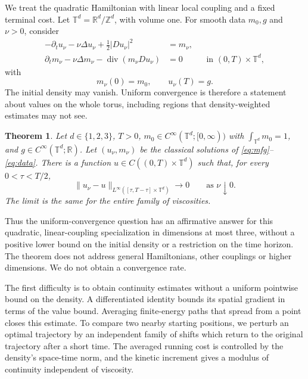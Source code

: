 \documentclass[11pt]{article}
\newcommand{\T}{\mathbb T}
\numberwithin{equation}{section}
\newtheorem{theorem}{Theorem}[section]
\begin{document}
We treat the quadratic Hamiltonian with linear local coupling and a
fixed terminal cost. Let \(\T^d=\mathbb R^d/\mathbb Z^d\), with volume
one. For smooth data \(m_0,g\) and \(\nu>0\), consider
\begin{equation}\label{eq:mfg}
\begin{aligned}
 -\partial_tu_\nu-\nu\Delta u_\nu+\tfrac12|Du_\nu|^2&=m_\nu,\\
 \partial_tm_\nu-\nu\Delta m_\nu-\operatorname{div}(m_\nu Du_\nu)&=0
                &&\text{in }(0,T)\times\T^d,
\end{aligned}
\end{equation}
with
\begin{equation}\label{eq:data}
 m_\nu(0)=m_0,\qquad u_\nu(T)=g .
\end{equation}
The initial density may vanish. Uniform convergence is therefore a
statement about values on the whole torus, including regions that
density-weighted estimates may not see.

\begin{theorem}\label{thm:main}
Let \(d\in\{1,2,3\}\), \(T>0\),
\(m_0\in C^\infty(\T^d;[0,\infty))\) with \(\int_{\T^d}m_0=1\),
and \(g\in C^\infty(\T^d;\mathbb R)\).
Let \((u_\nu,m_\nu)\) be the classical solutions of
\eqref{eq:mfg}--\eqref{eq:data}. There is a function
\(u\in C((0,T)\times\T^d)\) such that, for every \(0<\tau<T/2\),
\begin{equation}\label{eq:main-limit}
 \|u_\nu-u\|_{L^\infty([\tau,T-\tau]\times\T^d)}
       \longrightarrow0\qquad\text{as }\nu\downarrow0 .
\end{equation}
The limit is the same for the entire family of viscosities.
\end{theorem}

Thus the uniform-convergence question has an affirmative answer for this
quadratic, linear-coupling specialization in dimensions at most three,
without a positive lower bound on the initial density or a restriction on
the time horizon. The theorem does not address general Hamiltonians,
other couplings or higher dimensions. We do not obtain a convergence rate.

The first difficulty is to obtain continuity estimates without a uniform
pointwise bound on the density. A differentiated identity bounds its
spatial gradient in terms of the value bound. Averaging finite-energy
paths that spread from a point closes this estimate. To compare two
nearby starting positions, we perturb an optimal trajectory by an
independent family of shifts which return to the original trajectory
after a short time. The averaged running cost is controlled by the
density's space-time norm, and the kinetic increment gives a modulus
of continuity independent of viscosity.
\end{document}
